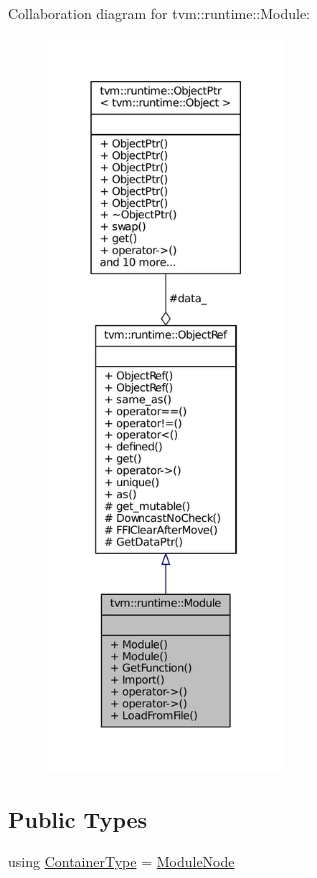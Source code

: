 Collaboration diagram for tvm\+:\+:runtime\+:\+:Module\+:
\nopagebreak
\begin{figure}[H]
\begin{center}
\leavevmode
\includegraphics[height=550pt]{classtvm_1_1runtime_1_1Module__coll__graph}
\end{center}
\end{figure}
\subsection*{Public Types}
\begin{DoxyCompactItemize}
\item 
using \hyperlink{classtvm_1_1runtime_1_1Module_a2e17df628886ffd624ab5835e85b1a58}{Container\+Type} = \hyperlink{classtvm_1_1runtime_1_1ModuleNode}{Module\+Node}
\end{DoxyCompactItemize}
